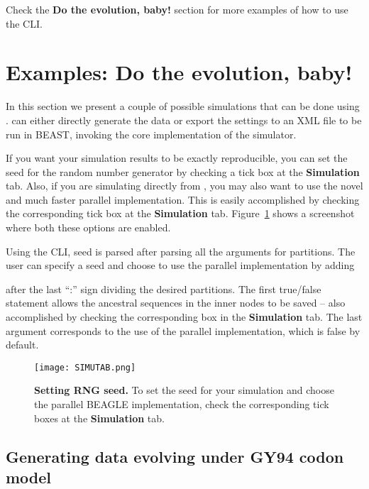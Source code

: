 Check the \textbf{Do the evolution, baby!} section for more examples of how to use the CLI.

\section{Examples: Do the evolution, baby!}

In this section we present a couple of possible simulations that can be done using {\bussname}.
{\bussname} can either directly generate the data or export the settings to an XML file to be run in BEAST, invoking the core implementation of the simulator.

If you want your simulation results to be exactly reproducible, you can set the seed for the random number generator by checking a tick box at the {\bf Simulation} tab.
Also, if you are simulating directly from {\bussname}, you may also want to use the novel and much faster parallel implementation.
This is easily accomplished by checking the corresponding tick box at the {\bf Simulation} tab.
Figure~\ref{fig:simutab} shows a screenshot where both these options are enabled.

Using the CLI, seed is parsed after parsing all the arguments for partitions.
The user can specify a seed and choose to use the parallel implementation by adding 
\begin{code} %
[<output-file-name>] [<seed>] [<true|false>] [<true|false>]
\end{code}
after the last ``:'' sign dividing the desired partitions.
The first true/false statement allows the ancestral sequences in the inner nodes to  be saved -- also accomplished by checking the corresponding box in the {\bf Simulation} tab.
The last argument corresponds to the use of the parallel implementation, which is false by default. 

\begin{figure}[h!]
\centering
\texttt{[image: SIMUTAB.png]} 
\caption{
{ \footnotesize 
{\bf Setting RNG seed.}
To set the seed for your simulation and choose the parallel BEAGLE implementation, check the corresponding tick boxes at the {\bf Simulation} tab.
} %
}
\label{fig:simutab}
\end{figure}

\subsection{Generating data evolving under GY94 codon model}

